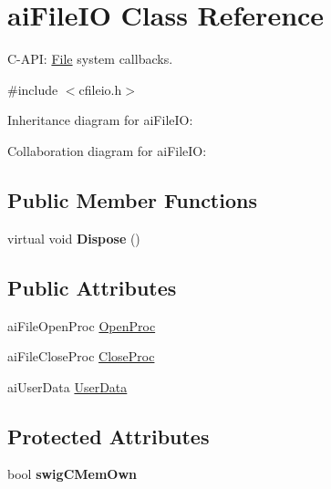 \hypertarget{structai_file_i_o}{\section{ai\+File\+I\+O Class Reference}
\label{structai_file_i_o}
}


C-\/\+A\+P\+I\+: \hyperlink{class_file}{File} system callbacks.  




{\ttfamily \#include $<$cfileio.\+h$>$}



Inheritance diagram for ai\+File\+I\+O\+:


Collaboration diagram for ai\+File\+I\+O\+:
\subsection*{Public Member Functions}
\begin{DoxyCompactItemize}
\item 
\hypertarget{structai_file_i_o_abe7e6a1dd794db26d68f8b445c24fd1d}{virtual void {\bfseries Dispose} ()}\label{structai_file_i_o_abe7e6a1dd794db26d68f8b445c24fd1d}

\end{DoxyCompactItemize}
\subsection*{Public Attributes}
\begin{DoxyCompactItemize}
\item 
ai\+File\+Open\+Proc \hyperlink{structai_file_i_o_a819d9c7823039294125068d06949a6df}{Open\+Proc}
\item 
ai\+File\+Close\+Proc \hyperlink{structai_file_i_o_a7ec702672712b5a02dc49cb17f980a14}{Close\+Proc}
\item 
ai\+User\+Data \hyperlink{structai_file_i_o_a9c62b7f3d70fbb2f41e33ad0b9933139}{User\+Data}
\end{DoxyCompactItemize}
\subsection*{Protected Attributes}
\begin{DoxyCompactItemize}
\item 
\hypertarget{structai_file_i_o_a94af9327cd6c9c7d8bfd6d68be5c252c}{bool {\bfseries swig\+C\+Mem\+Own}}\label{structai_file_i_o_a94af9327cd6c9c7d8bfd6d68be5c252c}

\end{DoxyCompactItemize}
